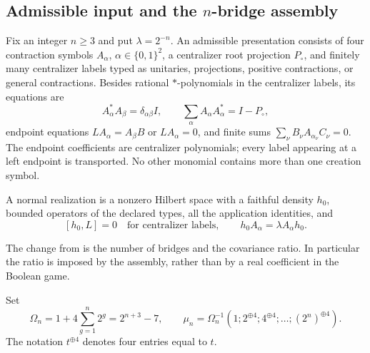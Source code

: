\subsection{Admissible input and the \texorpdfstring{$n$}{n}-bridge assembly}
\begin{definition}\label{def:admissible}
Fix an integer $n\geq3$ and put $\lambda=2^{-n}$. An admissible presentation consists of four contraction symbols $A_\alpha$, $\alpha\in\{0,1\}^2$, a centralizer root projection $P_\circ$, and finitely many centralizer labels typed as unitaries, projections, positive contractions, or general contractions. Besides rational $*$-polynomials in the centralizer labels, its equations are
\[
 A_\alpha^*A_\beta=\delta_{\alpha\beta}I,\qquad
 \sum_\alpha A_\alpha A_\alpha^*=I-P_\circ,
\]
endpoint equations $LA_\alpha=A_\beta B$ or $LA_\alpha=0$, and finite sums $\sum_\nu B_\nu A_{\alpha_\nu}C_\nu=0$. The endpoint coefficients are centralizer polynomials; every label appearing at a left endpoint is transported. No other monomial contains more than one creation symbol.

A normal realization is a nonzero Hilbert space with a faithful density $h_0$, bounded operators of the declared types, all the application identities, and
\begin{equation}\label{eq:covariance}
 [h_0,L]=0\quad\text{for centralizer labels},\qquad
 h_0A_\alpha=\lambda A_\alpha h_0.
\end{equation}
\end{definition}
The change from \cite[Definition in Section~4.4]{Sigma2} is the number of bridges and the covariance ratio. In particular the ratio is imposed by the assembly, rather than by a real coefficient in the Boolean game.

Set
\begin{equation}\label{eq:weights}
 \Omega_n=1+4\sum_{g=1}^n2^g=2^{n+3}-7,\qquad
 \mu_n=\Omega_n^{-1}(1;2^{\oplus4};4^{\oplus4};\ldots;(2^n)^{\oplus4}).
\end{equation}
The notation $t^{\oplus4}$ denotes four entries equal to $t$.

